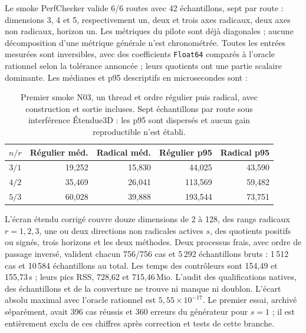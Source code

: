 \documentclass[11pt,a4paper]{article}
\newcommand{\code}[1]{\texttt{#1}}
\begin{document}
Le smoke PerfChecker valide 6/6 routes avec 42 échantillons, sept par
route : dimensions 3, 4 et 5, respectivement un, deux et trois axes
radicaux, deux axes non radicaux, horizon un. Les métriques du pilote
sont déjà diagonales ; aucune décomposition d'une métrique générale
n'est chronométrée. Toutes les entrées mesurées sont inversibles,
avec des coefficients \code{Float64} comparés à l'oracle rationnel
selon la tolérance annoncée ; leurs quotients ont une partie scalaire
dominante. Les médianes et p95 descriptifs en
microsecondes sont :

\begin{table}[ht]
\centering\small
\begin{tabular}{@{}crrrr@{}}
\toprule
$n/r$ & Régulier méd. & Radical méd. & Régulier p95 & Radical p95 \\
\midrule
$3/1$ & 19,252 & 15,830 & 44,025 & 43,590 \\
$4/2$ & 35,469 & 26,041 & 113,569 & 59,482 \\
$5/3$ & 60,028 & 39,888 & 193,544 & 73,751 \\
\bottomrule
\end{tabular}
\caption{Premier smoke N03, un thread et ordre régulier puis radical,
avec construction et sortie incluses. Sept échantillons par route sous
interférence Étendue3D : les p95 sont dispersés et aucun gain
reproductible n'est établi.}
\label{tab:n03smoke}
\end{table}

L'écran étendu corrigé couvre douze dimensions de 2 à 128, des rangs
radicaux $r=1,2,3$, une ou deux directions non radicales actives
$s$, des quotients positifs ou signés, trois horizons et les deux
méthodes. Deux processus frais, avec ordre de passage inversé, valident
chacun 756/756 cas et 5\,292 échantillons bruts : 1\,512 cas et
10\,584 échantillons au total. Les temps des
contrôleurs sont 154,49 et 155,73\,s ; leurs pics RSS, 728,62 et
715,46\,Mio. L'audit des qualifications natives, des échantillons et
de la couverture ne trouve ni manque ni doublon. L'écart absolu maximal
avec l'oracle rationnel est $5,55\times10^{-17}$. Le premier essai,
archivé séparément, avait 396 cas réussis et 360 erreurs du générateur
pour $s=1$ ; il est entièrement exclu de ces chiffres après correction
et tests de cette branche.
\end{document}
